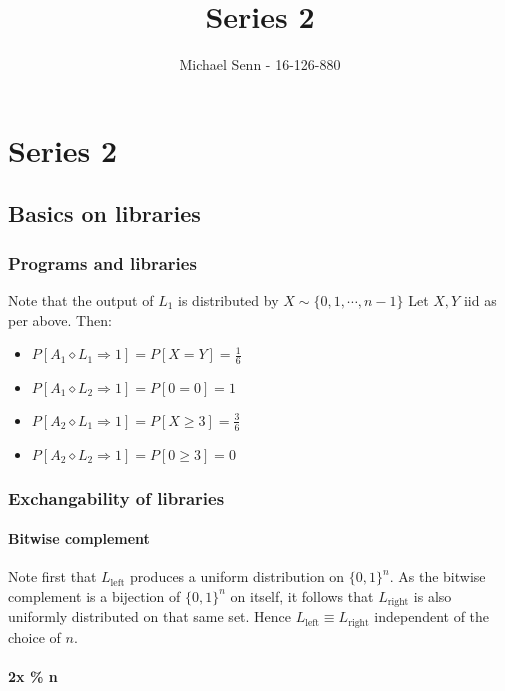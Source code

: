 \documentclass[a4paper]{scrreprt}
\title{Series 2}
\author{Michael Senn \maillink{michael.senn@students.unibe.ch} - 16-126-880}
\date{\printdate}
\begin{document}
\maketitle


\setcounter{chapter}{1}
\chapter{Series 2}

\section{Basics on libraries}

\subsection{Programs and libraries}

Note that the output of $L_1$ is distributed by $X \sim \{0, 1, \cdots, n-1\}$
Let $X, Y$ iid as per above. Then:

\begin{itemize}
	\item $P[A_1 \diamond L_1 \Rightarrow 1] = P[X = Y] = \frac{1}{6}$
	\item $P[A_1 \diamond L_2 \Rightarrow 1] = P[0 = 0] = 1$
	\item $P[A_2 \diamond L_1 \Rightarrow 1] = P[X \geq 3] = \frac{3}{6}$
	\item $P[A_2 \diamond L_2 \Rightarrow 1] = P[0 \geq 3] = 0$

\end{itemize}

\subsection{Exchangability of libraries}

\subsubsection{Bitwise complement}

Note first that $L_{\text{left}}$ produces a uniform distribution on $\{0,
1\}^n$. As the bitwise complement is a bijection of $\{0, 1\}^n$ on itself, it
follows that $L_{\text{right}}$ is also uniformly distributed on that same set.
Hence $L_{\text{left}} \equiv L_{\text{right}}$ independent of the choice of
$n$.

\subsubsection{2x \% n}
\end{document}
